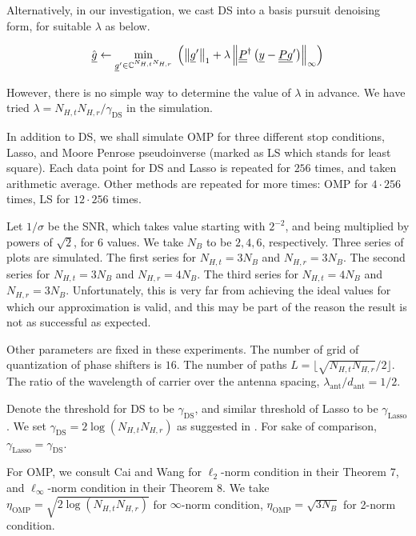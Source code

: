 \documentclass[journal]{IEEEtran}
\newcommand {\g} {\gamma}
\newcommand {\h} {\eta}
\renewcommand {\l} {\lambda}
\newcommand {\s} {\sigma}
\newcommand {\D} {\cdot}
\newcommand {\Adj} {\dagger}
\newcommand {\m} [1] {\( #1 \)}
\newcommand {\V} [1] {\underline {#1}}
\newcommand {\M} [1] {\underline {\underline {#1}}}
\newcommand {\RB} [1] {\left( #1 \right)}
\newcommand {\VNm} [1] {\left \Vert #1 \right \Vert}
\newcommand {\R} [1] {\sqrt {#1}}
\newcommand {\Min} [1] {\underset {#1} {\mathrm {min}}\;}
\newcommand {\Disp} [1] {
   \begin {align*}
      #1
   \end {align*}
}
\begin{document}
Alternatively, in our investigation, we cast DS into a basis pursuit denoising form, for suitable \m {\l} \cite {BoV04} as below.

\Disp {
\Hat {\V {g}}
\leftarrow \Min {\V {g}' \in \mathbb {C} ^{N_{H,t} N_{H,r}}}
\RB {\VNm {\V {g}'} _1 + \l \VNm {\M {P}^\Adj \RB {\V {y} -\M {P} \V {g}'}} _\infty}
}

However, there is no simple way to determine the value of \m {\l} in advance.
We have tried \m {\l = N_{H,t} N_{H,r} / \g_{\mathrm {DS}}} in the simulation.

In addition to DS, we shall simulate OMP for three different stop conditions, Lasso, and Moore Penrose pseudoinverse (marked as LS which stands for least square).
Each data point for DS and Lasso is repeated for \m {256} times, and taken arithmetic average.
Other methods are repeated for more times: OMP for \m {4 \D 256} times, LS for \m {12 \D 256} times.

Let \m {1/\s} be the SNR, which takes value starting with \m {2^{-2}}, and being multiplied by powers of \m {\R {2}}, for \m {6} values.
We take \m {N_B} to be \m {2, 4, 6}, respectively.
Three series of plots are simulated.
The first series for \m {N_{H,t} = 3 N_B} and \m {N_{H,r} = 3 N_B}.
The second series for \m {N_{H,t} = 3 N_B} and \m {N_{H,r} = 4 N_B}.
The third series for \m {N_{H,t} = 4 N_B} and \m {N_{H,r} = 3 N_B}.
Unfortunately, this is very far from achieving the ideal values for which our approximation is valid, and this may be part of the reason the result is not as successful as expected.

Other parameters are fixed in these experiments.
The number of grid of quantization of phase shifters is \m {16}.
The number of paths \m {L = \lfloor \R {N_{H,t} N_{H,r}} / 2 \rfloor}.
The ratio of the wavelength of carrier over the antenna spacing, \m {\l _{\mathrm {ant}} / d _{\mathrm {ant}} = 1 / 2}.

Denote the threshold for DS to be \m {\g_{\mathrm {DS}}}, and similar threshold of Lasso to be \m {\g_{\mathrm {Lasso}}}.
We set \m {\g_{\mathrm {DS}} = 2 \log \RB {N_{H,t} N_{H,r}}} as suggested in \cite {CaT07}.
For sake of comparison, \m {\g_{\mathrm {Lasso}} = \g_{\mathrm {DS}}}.

For OMP, we consult Cai and Wang \cite {CaW11} for \m {\ell _2}-norm condition in their Theorem 7, and \m {\ell _\infty}-norm condition in their Theorem 8.
We take \m {\h_{\mathrm {OMP}} = \R {2 \log \RB {N_{H,t} N_{H,r}}}} for \m {\infty}-norm condition, \m {\h_{\mathrm {OMP}} = \R {3 N_B}} for 2-norm condition.
\end{document}
